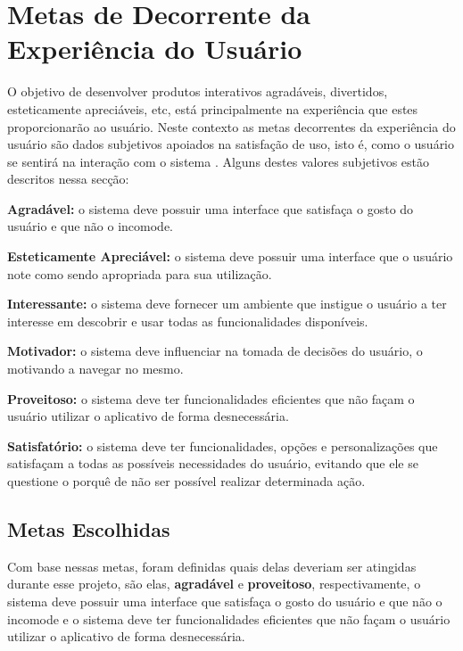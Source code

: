 \chapter[Metas Decorrente da Experiência do Usuário]{Metas de Decorrente da Experiência do Usuário}

O objetivo de desenvolver produtos interativos agradáveis, divertidos, esteticamente apreciáveis, etc, está principalmente na experiência que estes proporcionarão ao usuário. Neste contexto as metas decorrentes da experiência do usuário são dados subjetivos apoiados na satisfação de uso,  isto é, como o usuário se sentirá na interação com o sistema \cite{SHROPR}. Alguns destes valores subjetivos estão descritos nessa secção:

\hspace{1.3cm}
\textbf{Agradável:} o sistema deve possuir uma interface que satisfaça o gosto do usuário e que não o incomode.

\hspace{1.3cm}
\textbf{Esteticamente Apreciável:} o sistema deve possuir uma interface que o usuário note como sendo apropriada para sua utilização.

\hspace{1.3cm}
\textbf{Interessante:} o sistema deve fornecer um ambiente que instigue o usuário a ter interesse em descobrir e usar todas as funcionalidades disponíveis.

\hspace{1.3cm}
\textbf{Motivador:} o sistema deve influenciar na tomada de decisões do usuário, o motivando a navegar no mesmo.

\hspace{1.3cm}
\textbf{Proveitoso:} o sistema deve ter funcionalidades eficientes que não façam o usuário utilizar o aplicativo de forma desnecessária.

\hspace{1.3cm}
\textbf{Satisfatório:} o sistema deve ter funcionalidades, opções e personalizações que satisfaçam a todas as possíveis necessidades do usuário, evitando que ele se questione o porquê de não ser possível realizar determinada ação.

\section{Metas Escolhidas}

Com base nessas metas, foram definidas quais delas deveriam ser atingidas durante esse projeto, são elas, \textbf{agradável} e \textbf{proveitoso}, respectivamente, o sistema deve possuir uma interface que satisfaça o gosto do usuário e que não o incomode e o sistema deve ter funcionalidades eficientes que não façam o usuário utilizar o aplicativo de forma desnecessária.